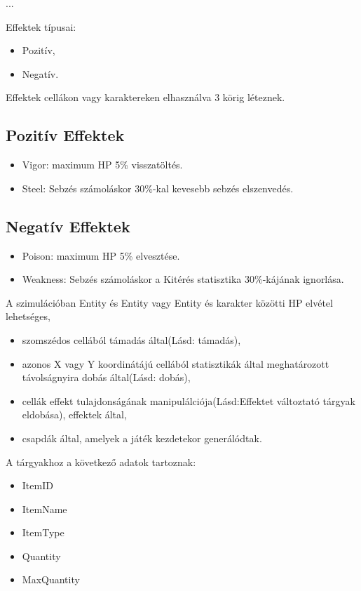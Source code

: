 ...


Effektek típusai:
\begin{itemize}
    \item Pozitív,
    \item Negatív.
\end{itemize}
Effektek cellákon vagy karaktereken elhasználva 3 körig léteznek.

\subsection{Pozitív Effektek}

\begin{itemize}
    \item Vigor: maximum HP 5\% visszatöltés.
    \item Steel: Sebzés számoláskor 30\%-kal kevesebb sebzés elszenvedés.
\end{itemize}

\subsection{Negatív Effektek}

\begin{itemize}
    \item Poison: maximum HP 5\% elvesztése.
    \item Weakness: Sebzés számoláskor a Kitérés statisztika 30\%-kájának ignorlása.
\end{itemize}


A szimulációban Entity és Entity vagy Entity és karakter közötti HP elvétel lehetséges,
\begin{itemize}
    \item szomszédos cellából támadás által(Lásd: támadás),
    \item azonos X vagy Y koordinátájú cellából statisztikák által meghatározott távolságnyira dobás által(Lásd: dobás),
    \item cellák effekt tulajdonságának manipulálciója(Lásd:Effektet változtató tárgyak eldobása), effektek által,
    \item csapdák által, amelyek a játék kezdetekor generálódtak.
\end{itemize}



A tárgyakhoz a következő adatok tartoznak:
\begin{itemize}
    \item ItemID
    \item ItemName
    \item ItemType
    \item Quantity
    \item MaxQuantity
\end{itemize}

